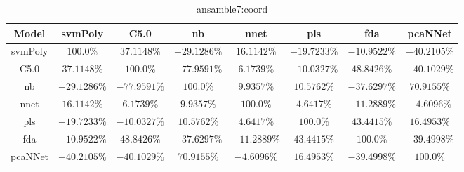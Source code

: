 \begin{table}[!ht]
	\centering
	\begin{tabular}{|c|c|c|c|c|c|c|c|}
		\hline
		Model & svmPoly & C5.0 & nb & nnet & pls & fda & pcaNNet \\ \hline
		svmPoly & $100.0\%$ & $37.1148\%$ & $-29.1286\%$ & $16.1142\%$ & $-19.7233\%$ & $-10.9522\%$ & $-40.2105\%$ \\ \hline
		C5.0 & $37.1148\%$ & $100.0\%$ & $-77.9591\%$ & $6.1739\%$ & $-10.0327\%$ & $48.8426\%$ & $-40.1029\%$ \\ \hline
		nb & $-29.1286\%$ & $-77.9591\%$ & $100.0\%$ & $9.9357\%$ & $10.5762\%$ & $-37.6297\%$ & $70.9155\%$ \\ \hline
		nnet & $16.1142\%$ & $6.1739\%$ & $9.9357\%$ & $100.0\%$ & $4.6417\%$ & $-11.2889\%$ & $-4.6096\%$ \\ \hline
		pls & $-19.7233\%$ & $-10.0327\%$ & $10.5762\%$ & $4.6417\%$ & $100.0\%$ & $43.4415\%$ & $16.4953\%$ \\ \hline
		fda & $-10.9522\%$ & $48.8426\%$ & $-37.6297\%$ & $-11.2889\%$ & $43.4415\%$ & $100.0\%$ & $-39.4998\%$ \\ \hline
		pcaNNet & $-40.2105\%$ & $-40.1029\%$ & $70.9155\%$ & $-4.6096\%$ & $16.4953\%$ & $-39.4998\%$ & $100.0\%$ \\ \hline
	\end{tabular}
	\caption{ansamble7:coord}
	\label{tab:ansamble7:coord}
\end{table}
